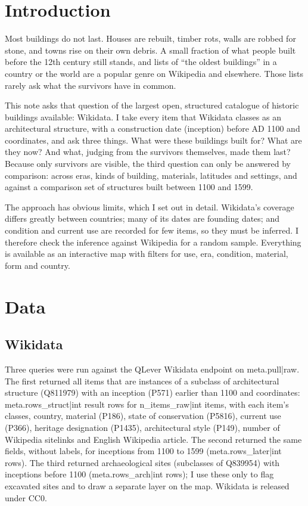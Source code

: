 \documentclass[11pt,a4paper]{article}
\begin{document}
\section{Introduction}

Most buildings do not last. Houses are rebuilt, timber rots, walls are robbed for stone, and towns rise on their own debris. A small fraction of what people built before the 12th century still stands, and lists of ``the oldest buildings'' in a country or the world are a popular genre on Wikipedia and elsewhere. Those lists rarely ask what the survivors have in common.

This note asks that question of the largest open, structured catalogue of historic buildings available: Wikidata. I take every item that Wikidata classes as an architectural structure, with a construction date (inception) before AD 1100 and coordinates, and ask three things. What were these buildings built for? What are they now? And what, judging from the survivors themselves, made them last? Because only survivors are visible, the third question can only be answered by comparison: across eras, kinds of building, materials, latitudes and settings, and against a comparison set of structures built between 1100 and 1599.

The approach has obvious limits, which I set out in detail. Wikidata's coverage differs greatly between countries; many of its dates are founding dates; and condition and current use are recorded for few items, so they must be inferred. I therefore check the inference against Wikipedia for a random sample. Everything is available as an interactive map with filters for use, era, condition, material, form and country.

\section{Data}

\subsection{Wikidata}

Three queries were run against the QLever Wikidata endpoint on {{meta.pull|raw}}. The first returned all items that are instances of a subclass of architectural structure (Q811979) with an inception (P571) earlier than 1100 and coordinates: {{meta.rows_struct|int}} result rows for {{n_items_raw|int}} items, with each item's classes, country, material (P186), state of conservation (P5816), current use (P366), heritage designation (P1435), architectural style (P149), number of Wikipedia sitelinks and English Wikipedia article. The second returned the same fields, without labels, for inceptions from 1100 to 1599 ({{meta.rows_later|int}} rows). The third returned archaeological sites (subclasses of Q839954) with inceptions before 1100 ({{meta.rows_arch|int}} rows); I use these only to flag excavated sites and to draw a separate layer on the map. Wikidata is released under CC0.
\end{document}
